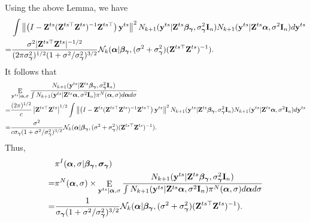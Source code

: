 \documentclass[11pt]{article}
\DeclareMathOperator{\myE}{E}
\newcommand{\By}{\mathbf{y}}    \newcommand{\Bz}{\mathbf{z}}
\newcommand{\bfsym}[1]{\ensuremath{\boldsymbol{#1}}}
\def\balpha{\bfsym \alpha}
\def\bbeta{\bfsym \beta}
\def\bgamma{\bfsym \gamma}             \def\bGamma{\bfsym \Gamma}
\def\bsigma{\bfsym \sigma}             \def\bSigma{\bfsym \Sigma}
\theoremstyle{plain}
\theoremstyle{definition}
\theoremstyle{remark}
\begin{document}
Using the above Lemma, we have
\begin{equation*}
    \begin{split}
    &\int
     \left\|\left(I-\BZ^{ts} (\BZ^{ts\top} \BZ^{ts})^{-1}\BZ^{ts\top}\right)\By^{ts}\right\|^2
    N_{k+1} (\By^{ts} | \BZ^{ts} \bbeta_{\bgamma}, \sigma^2_{\bgamma} \BI_n)
    N_{k+1} (\By^{ts} | \BZ^{ts} \balpha, \sigma^2 \BI_n)
    d\By^{ts}
    \\
    =
    &
    \frac{\sigma^2 |\BZ^{ts \top} \BZ^{ts}|^{-1/2}}{(2\pi\sigma^2_{\bgamma})^{1/2}(1+\sigma^2/\sigma^2_{\bgamma})^{3/2}}
    \mathcal N_k (\balpha | \bbeta_{\bgamma}, (\sigma^2 +\sigma^2_{\bgamma})(\BZ^{ts\top} \BZ^{ts})^{-1}).
    \end{split}
\end{equation*}
It follows that
\begin{equation*}
    \begin{split}
    &\myE_{\By^{ts}|\balpha, \sigma}
    \frac{N_{k+1} (\By^{ts} | \BZ^{ts} \bbeta_{\bgamma}, \sigma^2_{\bgamma} \BI_n)}{\int N_{k+1} (\By^{ts} | \BZ^{ts} \balpha, \sigma^2 \BI_n) \pi^N (\balpha, \sigma) d\balpha d \sigma}
    \\
    =
    &
    \frac{(2\pi)^{1/2}}{c} \left| \BZ^{ts\top} \BZ^{ts} \right|^{1/2} 
    \int
     \left\|\left(I-\BZ^{ts} (\BZ^{ts\top} \BZ^{ts})^{-1}\BZ^{ts\top}\right)\By^{ts}\right\|^2
    N_{k+1} (\By^{ts} | \BZ^{ts} \bbeta_{\bgamma}, \sigma^2_{\bgamma} \BI_n)
    N_{k+1} (\By^{ts} | \BZ^{ts} \balpha, \sigma^2 \BI_n)
    d\By^{ts}
    \\
    =
    &
    \frac{\sigma^2}{c \sigma_{\bgamma} (1+\sigma^2/\sigma^2_{\bgamma})^{3/2} }
    \mathcal N_k (\balpha | \bbeta_{\bgamma}, (\sigma^2 +\sigma^2_{\bgamma})(\BZ^{ts\top} \BZ^{ts})^{-1}).
    \end{split}
\end{equation*}
Thus,
\begin{equation*}
    \begin{split}
    &\pi^I (\balpha, \sigma | \bbeta_{\bgamma}, \bsigma_{\bgamma}) 
    \\
    =&
    \pi^N (\balpha, \sigma ) 
    \times
    \myE_{\By^{ts}|\balpha, \sigma}
    \frac{N_{k+1} (\By^{ts} | \BZ^{ts} \bbeta_{\bgamma}, \sigma^2_{\bgamma} \BI_n)}{\int N_{k+1} (\By^{ts} | \BZ^{ts} \balpha, \sigma^2 \BI_n) \pi^N (\balpha, \sigma) d\balpha d \sigma}
    \\
    =
    &
    \frac{1}{ \sigma_{\bgamma} (1+\sigma^2/\sigma^2_{\bgamma})^{3/2} }
    \mathcal N_k (\balpha | \bbeta_{\bgamma}, (\sigma^2 +\sigma^2_{\bgamma})(\BZ^{ts\top} \BZ^{ts})^{-1}).
    \end{split}
\end{equation*}
\end{document}
